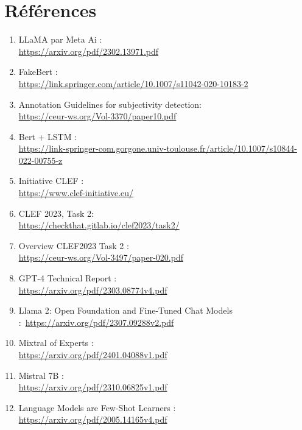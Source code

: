 \documentclass[11pt]{rapport_class}
\begin{document}
\chapter{Références}
\begin{enumerate}  
    \item \label{LLaMA} LLaMA par Meta Ai :\\
    \url{https://arxiv.org/pdf/2302.13971.pdf}
    \medskip
    \item \label{FakeBert} FakeBert :\\
    \url{https://link.springer.com/article/10.1007/s11042-020-10183-2}
    \medskip
    \item \label{Annotation} Annotation Guidelines for subjectivity detection: \\
    \url{ https://ceur-ws.org/Vol-3370/paper10.pdf}
    \item \label{LSTM} Bert + LSTM : \\
    \url{https://link-springer-com.gorgone.univ-toulouse.fr/article/10.1007/s10844-022-00755-z}
    \item \label{Initiative} Initiative CLEF :  \\
    \url {https://www.clef-initiative.eu/}
    \item \label{GIT} CLEF 2023, Task 2: \\ 
    \url {https://checkthat.gitlab.io/clef2023/task2/}
    \item \label{Overview} Overview CLEF2023 Task 2 : \\ 
    \url {https://ceur-ws.org/Vol-3497/paper-020.pdf} 
    \item \label{GPT-4} GPT-4 Technical Report :\\
    \url{https://arxiv.org/pdf/2303.08774v4.pdf}
    \item \label{llama 2} Llama 2: Open Foundation and Fine-Tuned Chat Models :\ 
    \url{https://arxiv.org/pdf/2307.09288v2.pdf}
    \item \label{Mixtral} Mixtral of Experts :\\
    \url {https://arxiv.org/pdf/2401.04088v1.pdf}
    \item \label{Mistral} Mistral 7B :\\
    \url{https://arxiv.org/pdf/2310.06825v1.pdf}
    \item \label{Few-Shot} Language Models are Few-Shot Learners : \\
    \url{https://arxiv.org/pdf/2005.14165v4.pdf}
\end{enumerate}
\end{document}
